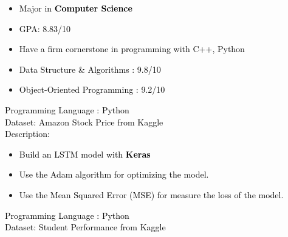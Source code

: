 \documentclass[10pt,a4paper,ragged2e,withhyper]{altacv}
\begin{document}
\begin{paracol}{2}
            \begin{itemize}
                \item \textcolor{black}{Major in \textbf{Computer Science}}
                \item \textcolor{black}{GPA: 8.83/10}
                \item \textcolor{black}{Have a firm cornerstone in programming with C++, Python}
                \item \textcolor{black}{Data Structure \& Algorithms : 9.8/10}
                \item \textcolor{black}{Object-Oriented Programming : 9.2/10}

            \end{itemize}
        
            \textcolor{black}{Programming Language : Python} \\
            \vspace{0.5em}
            \textcolor{black}{Dataset: Amazon Stock Price from Kaggle} \\
            \vspace{0.5em}
            \textcolor{black}{Description:} \\
            \vspace{0.5em}
            \begin{itemize}
                \item \textcolor{black}{Build an LSTM model with \textbf{Keras}}
                \item \textcolor{black}{Use the Adam algorithm for optimizing the model.}
                \item \textcolor{black}{Use the Mean Squared Error (MSE) for measure the loss of the model.}
            \end{itemize}

            
            \divider
            \textcolor{black}{Programming Language : Python} \\
            \vspace{0.5em}
            \textcolor{black}{Dataset: Student Performance from Kaggle} \\
            \vspace{0.5em}
            

\end{paracol}
\end{document}
